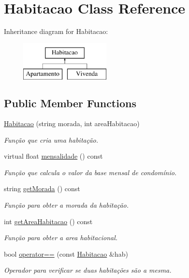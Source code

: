 \hypertarget{class_habitacao}{}\section{Habitacao Class Reference}
\label{class_habitacao}
Inheritance diagram for Habitacao\+:\begin{figure}[H]
\begin{center}
\leavevmode
\includegraphics[height=2.000000cm]{class_habitacao}
\end{center}
\end{figure}
\subsection*{Public Member Functions}
\begin{DoxyCompactItemize}
\item 
\hyperlink{class_habitacao_a3b5e5edb0ca3b52025ef46a796fcf18d}{Habitacao} (string morada, int area\+Habitacao)
\begin{DoxyCompactList}\small\item\em Função que cria uma habitação. \end{DoxyCompactList}\item 
virtual float \hyperlink{class_habitacao_a479d2307661c87b05242b86ba849fb6e}{mensalidade} () const 
\begin{DoxyCompactList}\small\item\em Função que calcula o valor da base mensal de condomínio. \end{DoxyCompactList}\item 
string \hyperlink{class_habitacao_a17ef78eef7746f92bd2814893bfafbab}{get\+Morada} () const 
\begin{DoxyCompactList}\small\item\em Função para obter a morada da habitação. \end{DoxyCompactList}\item 
int \hyperlink{class_habitacao_a8b8dc61b41f3bda37f3e517fe63f877a}{get\+Area\+Habitacao} () const 
\begin{DoxyCompactList}\small\item\em Função para obter a area habitacional. \end{DoxyCompactList}\item 
bool \hyperlink{class_habitacao_acd290b8d83f41d4667867d5dc353166e}{operator==} (const \hyperlink{class_habitacao}{Habitacao} \&hab)
\begin{DoxyCompactList}\small\item\em Operador para verificar se duas habitações são a mesma. \end{DoxyCompactList}\end{DoxyCompactItemize}


